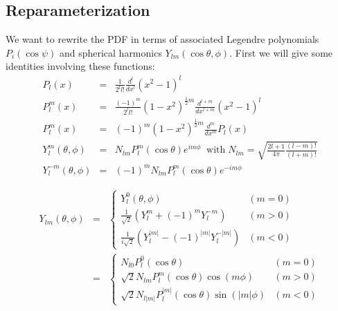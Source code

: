 \documentclass[a4paper,10pt,twosided]{article}
\begin{document}
\subsection{Reparameterization}
We want to rewrite the PDF in terms of associated Legendre polynomials $P_{i}(\cos\psi)$ and spherical harmonics $Y_{lm}(\cos\theta,\phi)$. First we will give some identities involving these functions:
\begin{eqnarray}
P_l(x) &=& \frac{1}{2^l l!} \frac{d^l}{dx^l}(x^2-1)^l \\
P_l^m(x) &=& \frac{(-1)^m}{2^l l!} (1-x^2)^{\frac{1}{2}m} \frac{d^{l+m}}{dx^{l+m}} (x^2-1)^l\\
P_l^m(x) &=& (-1)^m (1-x^2)^{\frac{1}{2}m} \frac{d^{m}}{dx^{m}} P_l(x)\\
Y_l^m (\theta,\phi) &=& N_{lm} P_l^m(\cos\theta)e^{im\phi}\;\;\mathrm{with}\;N_{lm} =\sqrt{ \frac{2l+1}{4\pi}\frac{(l-m)!}{(l+m)!} } \\
Y_l^{-m}(\theta,\phi) &=& (-1)^m N_{lm}P_l^m(\cos\theta) e^{-im\phi}
\end{eqnarray}

\begin{eqnarray}
Y_{lm}(\theta,\phi) & = & \left\{ \begin{array}{cl} 
                                             Y_l^0(\theta,\phi) & (m=0) \\
                                             \frac{1}{\sqrt{2}} \left( Y_l^m + (-1)^m Y_l^{-m}\right)  & (m>0) \\
                                             \frac{1}{i\sqrt{2}}\left( Y_l^{|m|}-(-1)^{|m|}Y_l^{-|m|} \right) & (m<0)
                                  \end{array}\right.\\
                    & = & \left\{ \begin{array}{cl} 
                                             N_{l0} P_l^0(\cos\theta) & (m=0) \\
                                             \sqrt{2}N_{lm}P_l^m(\cos\theta)\cos(m\phi) & (m>0) \\
                                             \sqrt{2}N_{l|m|} P_l^{|m|}(\cos\theta)\sin(|m|\phi)& (m<0)
                                  \end{array}\right.
\end{eqnarray}
\end{document}
